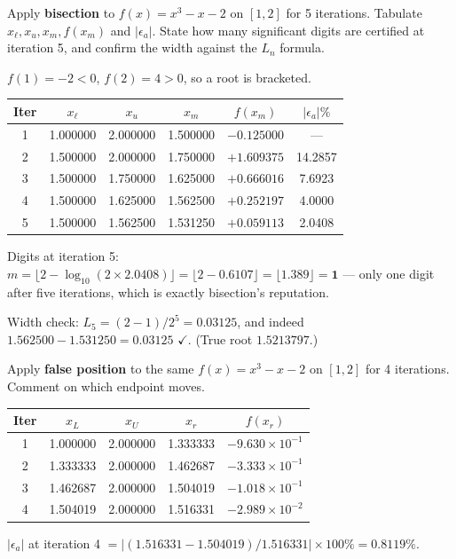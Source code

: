 \begin{probbox}
 Apply \textbf{bisection} to $f(x) = x^3-x-2$ on $[1,2]$ for 5 iterations. Tabulate $x_\ell, x_u, x_m, f(x_m)$ and $|\epsilon_a|$. State how many significant digits are certified at iteration 5, and confirm the width against the $L_n$ formula.

\ans $f(1) = -2 < 0$, $f(2) = 4 > 0$, so a root is bracketed.
\begin{center}\small
\begin{tabular}{@{}cccccc@{}}
\toprule
Iter & $x_\ell$ & $x_u$ & $x_m$ & $f(x_m)$ & $|\epsilon_a|\%$\\
\midrule
1 & 1.000000 & 2.000000 & 1.500000 & $-0.125000$ & ---\\
2 & 1.500000 & 2.000000 & 1.750000 & $+1.609375$ & 14.2857\\
3 & 1.500000 & 1.750000 & 1.625000 & $+0.666016$ & 7.6923\\
4 & 1.500000 & 1.625000 & 1.562500 & $+0.252197$ & 4.0000\\
5 & 1.500000 & 1.562500 & 1.531250 & $+0.059113$ & 2.0408\\
\bottomrule
\end{tabular}
\end{center}
Digits at iteration 5: $m = \lfloor 2-\log_{10}(2\times2.0408)\rfloor = \lfloor 2-0.6107\rfloor = \lfloor1.389\rfloor = \mathbf{1}$ --- only one digit after five iterations, which is exactly bisection's reputation.

Width check: $L_5 = (2-1)/2^5 = 0.03125$, and indeed $1.562500-1.531250 = 0.03125$ $\checkmark$. (True root $1.5213797$.)

 Apply \textbf{false position} to the same $f(x)=x^3-x-2$ on $[1,2]$ for 4 iterations. Comment on which endpoint moves.

\ans
\begin{center}\small
\begin{tabular}{@{}ccccc@{}}
\toprule
Iter & $x_L$ & $x_U$ & $x_r$ & $f(x_r)$\\
\midrule
1 & 1.000000 & 2.000000 & 1.333333 & $-9.630\times10^{-1}$\\
2 & 1.333333 & 2.000000 & 1.462687 & $-3.333\times10^{-1}$\\
3 & 1.462687 & 2.000000 & 1.504019 & $-1.018\times10^{-1}$\\
4 & 1.504019 & 2.000000 & 1.516331 & $-2.989\times10^{-2}$\\
\bottomrule
\end{tabular}
\end{center}
$|\epsilon_a|$ at iteration 4 $= |(1.516331-1.504019)/1.516331|\times100\% = 0.8119\%$.


\end{probbox}
